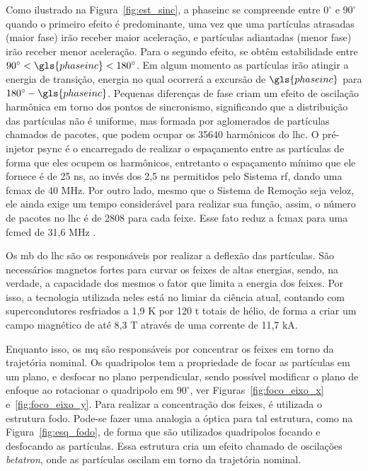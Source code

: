 Como ilustrado na Figura~\ref{fig:est_sinc}, a \gls{phaseinc} se compreende entre
$0^\circ$ e $90^\circ$ quando o primeiro efeito é predominante, uma vez que uma partículas 
atrasadas (maior fase) irão receber maior aceleração, 
e partículas adiantadas (menor fase) irão receber menor aceleração. Para o
segundo efeito, se obtêm estabilidade entre $90^\circ<\gls{phaseinc}<180^\circ$.
Em algum momento as partículas irão atingir a energia de transição, energia no
qual ocorrerá a excursão de $\gls{phaseinc}$ para $180^\circ - \gls{phaseinc}$. Pequenas
diferenças de fase criam um efeito de oscilação harmônica em torno dos pontos de
sincronismo, significando que a distribuição das partículas não é uniforme, mas
formada por aglomerados de partículas chamados de pacotes, que podem ocupar os
35640 harmônicos do \gls{lhc}. 
O pré-injetor \acrshort{psync} é o encarregado de realizar o espaçamento 
entre as partículas de forma que eles ocupem os harmônicos, entretanto o
espaçamento mínimo que ele fornece é de 25 ns, ao invés dos 2,5 ns permitidos
pelo Sistema \gls{rf}, dando uma \gls{fcmax} de 40 MHz. 
Por outro lado, mesmo que o Sistema de Remoção seja
veloz, ele ainda exige um tempo considerável para realizar sua função, assim, o
número de pacotes no \gls{lhc} é de 2808 para cada feixe. Esse fato reduz a
\gls{fcmax} para uma \gls{fcmed} de 31,6 MHz
\cite{closerLook,lhc_design,lecture_slides_1,lecture_slides_2}.



Os \gls{mb} do \gls{lhc} são os responsáveis por realizar a deflexão
das partículas.  São necessários magnetos fortes para curvar os feixes de altas
energias, sendo, na verdade, a capacidade dos mesmos o fator que limita a energia
dos feixes. Por isso, a tecnologia utilizada neles está no limiar da ciência
atual, contando com supercondutores resfriados a 1,9 K por 120 t totais de hélio, 
de forma a criar um campo magnético de até 8,3 T através de uma corrente de 11,7 kA. 

Enquanto isso, os \gls{mq} são responsáveis por concentrar os
feixes em torno da trajetória nominal. Os quadripolos tem a propriedade de
focar as partículas em um plano, e desfocar no plano perpendicular, sendo
possível modificar o plano de enfoque ao rotacionar o quadripolo em $90^\circ$,
ver Figuras~\ref{fig:foco_eixo_x} e~\ref{fig:foco_eixo_y}. 
Para realizar a concentração dos feixes, é
utilizada o estrutura \gls{fodo}. Pode-se fazer uma analogia a óptica para tal
estrutura, como na Figura~\ref{fig:esq_fodo}, de forma que são 
utilizados quadripolos focando e desfocando as partículas. Essa estrutura cria um efeito
chamado de oscilações \emph{betatron}, onde as partículas oscilam em torno da
trajetória nominal.

